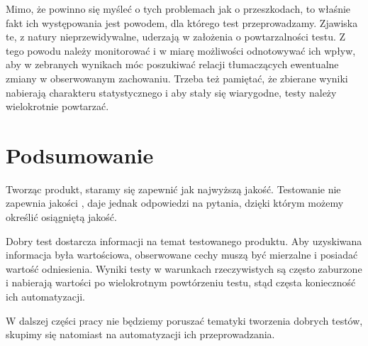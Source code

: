 \documentclass[00-praca-magisterska.tex]{subfiles}
\begin{document}
Mimo, że powinno się myśleć o tych problemach jak o przeszkodach, to właśnie
fakt ich występowania jest powodem, dla którego test przeprowadzamy. Zjawiska
te, z natury nieprzewidywalne, uderzają w założenia o powtarzalności testu. Z
tego powodu należy monitorować i w miarę możliwości odnotowywać ich wpływ, aby
w zebranych wynikach móc poszukiwać relacji tłumaczących ewentualne zmiany w
obserwowanym zachowaniu. Trzeba też pamiętać, że zbierane wyniki nabierają
charakteru statystycznego i aby stały się wiarygodne, testy należy wielokrotnie
powtarzać.

\section{Podsumowanie}

Tworząc produkt, staramy się zapewnić jak najwyższą jakość. Testowanie nie
zapewnia jakości \cite{good-test}, daje jednak odpowiedzi na pytania, dzięki
którym możemy określić osiągniętą jakość.

Dobry test dostarcza informacji na temat testowanego produktu. Aby uzyskiwana
informacja była wartościowa, obserwowane cechy muszą być mierzalne i posiadać
wartość odniesienia.  Wyniki testy w warunkach rzeczywistych są często
zaburzone i nabierają wartości po wielokrotnym powtórzeniu testu, stąd częsta
konieczność ich automatyzacji.

W dalszej części pracy nie będziemy poruszać tematyki tworzenia dobrych testów,
skupimy się natomiast na automatyzacji ich przeprowadzania.
\end{document}
